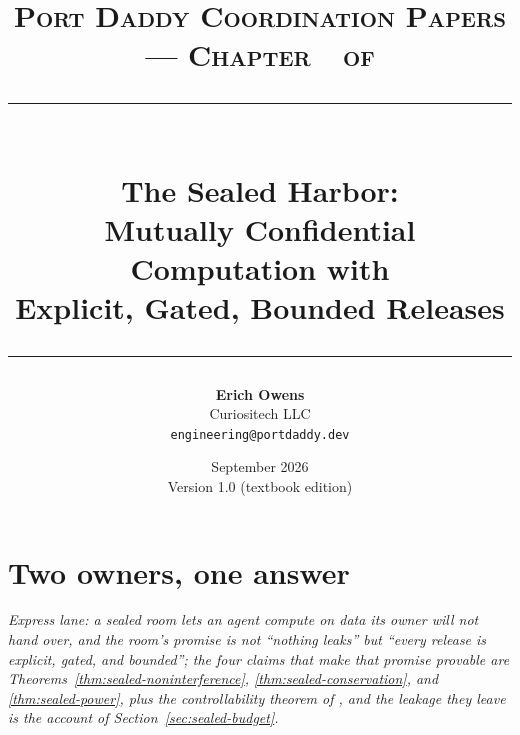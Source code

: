 \documentclass[11pt,a4paper]{article}
\title{
  \vspace{-1cm}
  {\Large\textsc{Port Daddy Coordination Papers --- Chapter~\pdchapternumber\ of \pdchaptercount}}\\[
0.5cm]
  \rule{\textwidth}{0.5pt}\\[0.3cm]
  {\LARGE\textbf{The Sealed Harbor:}}\\[0.2cm]
  {\Large Mutually Confidential Computation with\\Explicit, Gated, Bounded Releases}\\[0.3cm]
  \rule{\textwidth}{0.5pt}
}
\author{
  \textbf{Erich Owens}\\[0.2cm]
  Curiositech LLC\\[0.2cm]
  \texttt{engineering@portdaddy.dev}
}
\date{September 2026\\Version 1.0 (textbook edition)}
\theoremstyle{definition}
\begin{document}
\pdopensolutions
\setlength{\emergencystretch}{2em}
\maketitle
\thispagestyle{empty}
\vspace{1cm}
\section{Two owners, one answer}\label{sec:sealed-problem}
\noindent\emph{Express lane: a sealed room lets an agent compute on data its
owner will not hand over, and the room's promise is not ``nothing leaks'' but
``every release is explicit, gated, and bounded''; the four claims that make
that promise provable are Theorems~\ref{thm:sealed-noninterference},
\ref{thm:sealed-conservation}, and \ref{thm:sealed-power}, plus the
controllability theorem of , and the
leakage they leave is the account of Section~\ref{sec:sealed-budget}.}
\end{document}
